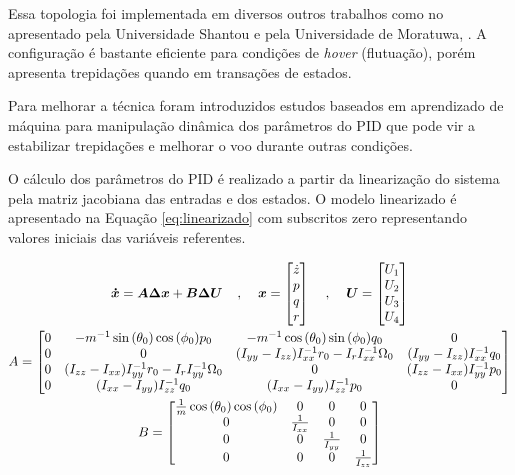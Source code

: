 \documentclass[main.tex]{subfiles}
\begin{document}
Essa topologia foi implementada em diversos outros trabalhos como no apresentado pela Universidade Shantou \cite{controle:pid} e pela Universidade de Moratuwa, \cite{controle:pid_modelagem_basica}. A configuração é bastante eficiente para condições de \textit{hover} (flutuação), porém apresenta trepidações quando em transações de estados.

Para melhorar a técnica foram introduzidos estudos baseados em aprendizado de máquina \cite{controle:pid-aprendizado-maquina} para manipulação dinâmica dos parâmetros do PID que pode vir a estabilizar trepidações e melhorar o voo durante outras condições.

O cálculo dos parâmetros do PID é realizado a partir da linearização do sistema pela matriz jacobiana das entradas e dos estados. O modelo linearizado é apresentado na Equação \ref{eq:linearizado} com subscritos zero representando valores iniciais das variáveis referentes.

\begin{equation}\label{eq:linearizado}
    \begin{gathered}
        \boldsymbol{\dot{x}} = \boldsymbol{A\Delta x} + \boldsymbol{B\Delta U}\hspace{0.4cm}, \hspace{0.4cm} \boldsymbol{x} = \begin{bmatrix}
        \dot{z}\\ 
        p\\
        q\\
        r
        \end{bmatrix} \hspace{0.4cm} , \hspace{0.4cm} \boldsymbol{U} = \begin{bmatrix}
            U_1\\ 
            U_2\\
            U_3\\
            U_4
        \end{bmatrix}\\
        A = \begin{bmatrix}
            0 & - m^{-1}\sin{(\theta_0)}\cos{(\phi_0)}p_0&- m^{-1}\cos{(\theta_0)}\sin{(\phi_0)}q_0&0\\ 
            0&0&(I_{yy} - I_{zz})I_{xx}^{-1}r_0 - I_{r}I_{xx}^{-1}\Omega_0&(I_{yy} - I_{zz})I_{xx}^{-1}q_0\\
            0&(I_{zz} - I_{xx})I_{yy}^{-1}r_0 - I_{r}I_{yy}^{-1}\Omega_0&0&(I_{zz} - I_{xx})I_{yy}^{-1}p_0\\
            0&(I_{xx} - I_{yy})I_{zz}^{-1}q_0&(I_{xx} - I_{yy})I_{zz}^{-1}p_0&0
        \end{bmatrix}\\ 
        B = \begin{bmatrix}
            \frac{1}{m}\cos{(\theta_0)}\cos{(\phi_0)}&0&0&0\\ 
            0&\frac{1}{I_{xx}}&0&0\\
            0&0&\frac{1}{I_{yy}}&0\\
            0&0&0&\frac{1}{I_{zz}}
        \end{bmatrix}
    \end{gathered}
\end{equation}
\end{document}
